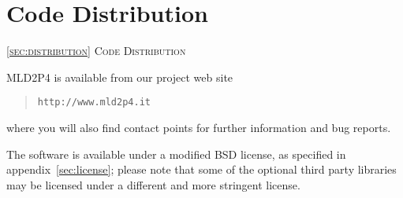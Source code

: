 \section{Code Distribution\label{sec:distribution}}
         {\textsc{\ref{sec:distribution} Code Distribution}}

\noindent
MLD2P4 is available from our project web site 
\begin{quotation}
\tt http://www.mld2p4.it
\end{quotation}
where you will also find contact points for further information and
bug reports. 

The software is available under a modified BSD license, as specified
in appendix~\ref{sec:license}; please note that some of the optional
third party libraries may be licensed under a different and more
stringent license. 
